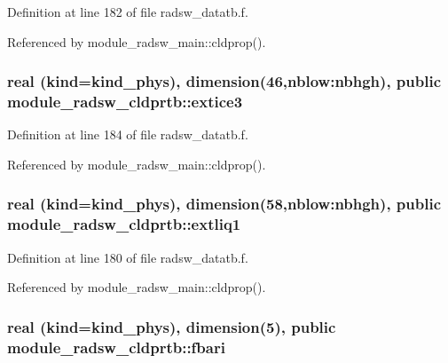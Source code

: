 Definition at line 182 of file radsw\+\_\+datatb.\+f.



Referenced by module\+\_\+radsw\+\_\+main\+::cldprop().

\subsubsection[{\texorpdfstring{extice3}{extice3}}]{\setlength{\rightskip}{0pt plus 5cm}real (kind=kind\+\_\+phys), dimension(46,nblow\+:nbhgh), public module\+\_\+radsw\+\_\+cldprtb\+::extice3}\hypertarget{namespacemodule__radsw__cldprtb_a8b8bae831aa5b460e260c94e7f24f4c7}{}\label{namespacemodule__radsw__cldprtb_a8b8bae831aa5b460e260c94e7f24f4c7}


Definition at line 184 of file radsw\+\_\+datatb.\+f.



Referenced by module\+\_\+radsw\+\_\+main\+::cldprop().

\subsubsection[{\texorpdfstring{extliq1}{extliq1}}]{\setlength{\rightskip}{0pt plus 5cm}real (kind=kind\+\_\+phys), dimension(58,nblow\+:nbhgh), public module\+\_\+radsw\+\_\+cldprtb\+::extliq1}\hypertarget{namespacemodule__radsw__cldprtb_ac68593a33577c720ca8c74eafb3c9f96}{}\label{namespacemodule__radsw__cldprtb_ac68593a33577c720ca8c74eafb3c9f96}


Definition at line 180 of file radsw\+\_\+datatb.\+f.



Referenced by module\+\_\+radsw\+\_\+main\+::cldprop().

\subsubsection[{\texorpdfstring{fbari}{fbari}}]{\setlength{\rightskip}{0pt plus 5cm}real (kind=kind\+\_\+phys), dimension(5), public module\+\_\+radsw\+\_\+cldprtb\+::fbari}\hypertarget{namespacemodule__radsw__cldprtb_ac2e5b61aea6effe7d49586bf5223c154}{}\label{namespacemodule__radsw__cldprtb_ac2e5b61aea6effe7d49586bf5223c154}


